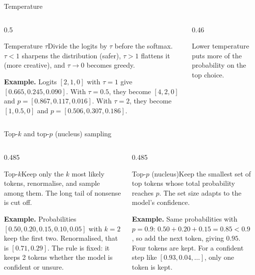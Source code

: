 \documentclass[aspectratio=169,11pt]{beamer}
\newcommand{\term}[3]{%
  \begin{block}{#1}\small #2\par\vspace{1mm}%
  {\color{exgreen}\textbf{Example.}} #3\end{block}}
\begin{document}
\begin{frame}{Temperature}
  \begin{columns}[T]
    \begin{column}{0.5\textwidth}
      \term{Temperature $\tau$}
      {Divide the logits by $\tau$ before the softmax. $\tau<1$ sharpens the distribution (safer), $\tau>1$ flattens it (more creative), and $\tau\to0$ becomes greedy.}
      {Logits $[2,1,0]$ with $\tau=1$ give $[0.665,0.245,0.090]$. With $\tau=0.5$, they become $[4,2,0]$ and $p=[0.867,0.117,0.016]$. With $\tau=2$, they become $[1,0.5,0]$ and $p=[0.506,0.307,0.186]$.}
    \end{column}
    \begin{column}{0.46\textwidth}
      \centering
      \vspace{1mm}

      {\small Lower temperature puts more of the probability on the top choice.}
    \end{column}
  \end{columns}
\end{frame}

\begin{frame}{Top-$k$ and top-$p$ (nucleus) sampling}
  \begin{columns}[T]
    \begin{column}{0.485\textwidth}
      \term{Top-$k$}
      {Keep only the $k$ most likely tokens, renormalise, and sample among them. The long tail of nonsense is cut off.}
      {Probabilities $[0.50,0.20,0.15,0.10,0.05]$ with $k=2$ keep the first two. Renormalised, that is $[0.71,0.29]$. The rule is fixed: it keeps 2 tokens whether the model is confident or unsure.}
    \end{column}
    \begin{column}{0.485\textwidth}
      \term{Top-$p$ (nucleus)}
      {Keep the smallest set of top tokens whose total probability reaches $p$. The set size adapts to the model's confidence.}
      {Same probabilities with $p=0.9$: $0.50+0.20+0.15=0.85<0.9$, so add the next token, giving $0.95$. Four tokens are kept. For a confident step like $[0.93,0.04,\ldots]$, only one token is kept.}
    \end{column}
  \end{columns}
\end{frame}
\end{document}
